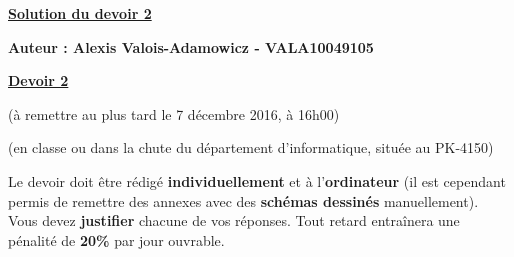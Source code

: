 \documentclass[12pt,addpoints]{exam}
\begin{document}
	
\ifprintanswers
  \vskip 1.2cm
  \centerline{\large\underline{\textbf{Solution du devoir 2}}}
  \vskip 0.5cm
  \begin{mdframed} \begin{center}
  \textbf{Auteur : Alexis Valois-Adamowicz - VALA10049105} \\
  \end{center} \end{mdframed}
  \vskip 0.5cm
\else
  \vskip 1.2cm
  \centerline{\large\underline{\textbf{Devoir 2}}}
  \centerline{\small (à remettre au plus tard le 7 décembre 2016, à 16h00)}
  \centerline{\small (en classe ou dans la chute du département d'informatique, située au PK-4150)}
  \vskip 1.2cm
Le devoir doit être rédigé \textbf{individuellement} et à l'\textbf{ordinateur} (il est cependant permis de remettre des annexes avec des \textbf{schémas dessinés} manuellement). Vous devez \textbf{justifier} chacune de vos réponses. Tout retard entraînera une pénalité de \textbf{20\%} par jour ouvrable.
\fi

\ifprintanswers
\else
\begin{center} \gradetable[h] \end{center}
\fi
\end{document}
